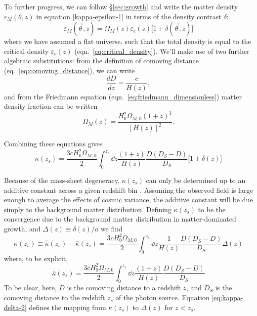 To further progress, we can follow \S\ref{sec:growth} and write the
matter density $\varepsilon_M(\theta, z)$ in equation
\ref{kappa-epsilon-1} in terms of the density contrast $\delta$:
\begin{equation}
  \label{delta-def}
  \varepsilon_M(\vec{\theta},z) = \Omega_M(z) \varepsilon_c(z)\Big[1+\delta(\vec{\theta},z)\Big]
\end{equation}
where we have assumed a flat universe, such that the total density is
equal to the critical density $\varepsilon_c(z)$
(eqn.~\ref{eq:critical_density}).
We'll make use of two further algebraic substitutions:
from the definition of comoving distance (eq.~\ref{eq:comoving_distance}),
we can write
\begin{equation}
  \label{dDdz}
  \frac{dD}{dz} = \frac{c}{H(z)},
\end{equation}
and from the Friedmann equation (eqn.~\ref{eq:friedmann_dimensionless})
matter density fraction can be written
\begin{equation}
  \Omega_M(z) = \frac{H_0^2\Omega_{M,0}(1+z)^3}{[H(z)]^2}.
\end{equation}


Combining these equations gives
\begin{equation}
  \label{eq:kappa-delta}
  \kappa(z_s) = \frac{3cH_0^2\Omega_{M,0}}{2}\int_0^{z_s} \dd z \frac{(1+z)}{H(z)} \frac{D(D_S-D)}{D_S}\big[1+\delta(z)\big]
\end{equation}

Because of the mass-sheet degeneracy, $\kappa(z_s)$ can only be determined
up to an additive constant across a given redshift bin
\citep[see][for discussion]{seitz_schneider1996}.
Assuming the observed field is large enough to average the effects of cosmic
variance, the additive constant will be due simply to the background
matter distribution.
Defining $\bar{\kappa}(z_s)$ to be the convergence due to the background
matter distribution in matter-dominated growth,
and $\Delta(z) \equiv \delta(z)/a$ we find
\begin{equation}
  \label{eq:kappa-delta-2}
  \kappa(z_s) \equiv \hat{\kappa}(z_s)-\bar\kappa(z_s) = 
  \frac{3cH_0^2\Omega_{M,0}}{2}\int_0^{z_s} \dd z 
  \frac{1}{H(z)} \frac{D(D_S-D)}{D_S}\Delta(z)
\end{equation}
where, to be explicit,
\begin{equation}
  \bar\kappa(z_s) = \frac{3cH_0^2\Omega_{M,0}}{2}\int_0^{z_s} \dd z 
  \frac{(1+z)}{H(z)} \frac{D(D_S-D)}{D_S}
\end{equation}
To be clear, here, $D$ is the comoving distance to a redshift $z$,
and $D_S$ is the comoving distance to the redshift $z_s$ of the photon
source.  Equation \ref{eq:kappa-delta-2} defines the mapping from $\kappa(z_s)$
to $\Delta(z)$ for $z<z_s$.

